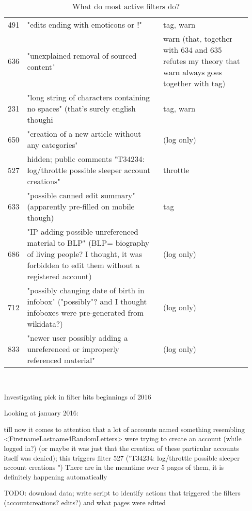 \begin{table*}
\begin{tabular}{r p{10cm} p{5cm} }
      491 & "edits ending with emoticons or !" & tag, warn \\
      636 & "unexplained removal of sourced content" & warn (that, together with 634 and 635 refutes my theory that warn always goes together with tag) \\
      231 & "long string of characters containing no spaces" (that's surely english though^^) & tag, warn \\
      650 & "creation of a new article without any categories" & (log only) \\
      527 & hidden; public comments "T34234: log/throttle possible sleeper account creations" & throttle \\
      633 & "possible canned edit summary" (apparently pre-filled on mobile though) & tag \\
      686 & "IP adding possible unreferenced material to BLP" (BLP= biography of living people? I thought, it was forbidden to edit them without a registered account) & (log only) \\
      712 & "possibly changing date of birth in infobox" ("possibly"? and I thought infoboxes were pre-generated from wikidata?) & (log only) \\
      833 & "newer user possibly adding a unreferenced or improperly referenced material" & (log only) \\
  \end{tabular}
  \caption{What do most active filters do?}~\label{tab:most-active-actions}
\end{table*}

Investigating pick in filter hits beginnings of 2016

Looking at january 2016:

till now it comes to attention that a lot of accounts named something resembling <FirstnameLastname4RandomLetters> were trying to create an account  (while logged in?) (or maybe it was just that the creation of these particular accounts itself was denied); this triggers filter 527 ("T34234: log/throttle possible sleeper account creations
")
There are in the meantime over 5 pages of them, it is definitely happening automatically

TODO: download data; write script to identify actions that triggered the filters (accountcreations? edits?) and what pages were edited

\begin{comment}
It is not, as some seem to believe, intended to block profanity in articles (that would be extraordinarily dim), nor even to revert page-blankings. That's what we have ClueBot and TawkerBot for, and they do a damn good job of it. This is a different tool, for different situations, which require different responses. I conceive that filters in this extension would be triggered fewer times than once every few hours. — Werdna • talk 13:23, 9 July 2008 (UTC) "
// longer clarification what is to be targeted. interestingly enough, I think the bulk of the things that are triggered today are precisely the ones Werdna points out as "we are not targeting them".
\end{comment}

